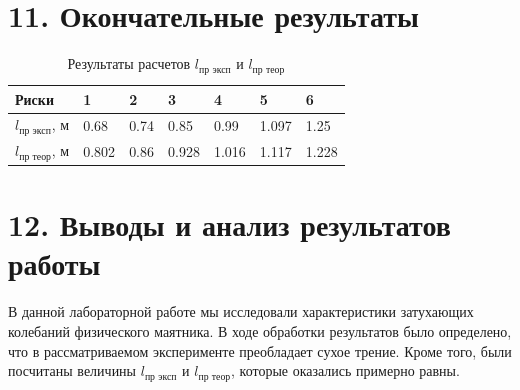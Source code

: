 \documentclass[14pt]{extreport}
\begin{document}
\newpage

\section*{11. Окончательные результаты}
\begin{table}[!h]
    \centering
    \begin{tabular}{|l|l|l|l|l|l|l|}
    \hline
        Риски & 1 & 2 & 3 & 4 & 5 & 6  \\ \hline
        $l_\text{пр эксп}$, м & 0.68 & 0.74 & 0.85 & 0.99 & 1.097 & 1.25  \\ \hline
        $l_\text{пр теор}$, м & 0.802 & 0.86 & 0.928 & 1.016 & 1.117 & 1.228 \\ \hline
    \end{tabular}
    \caption{Результаты расчетов $l_\text{пр эксп}$ и $l_\text{пр теор}$}
\end{table}


\section*{12. Выводы и анализ результатов работы}

В данной лабораторной работе мы исследовали характеристики затухающих колебаний физического маятника. В ходе обработки результатов было определено, что в рассматриваемом эксперименте преобладает сухое трение. Кроме того, были посчитаны величины $l_\text{пр эксп}$ и $l_\text{пр теор}$, которые оказались примерно равны. 
\end{document}
